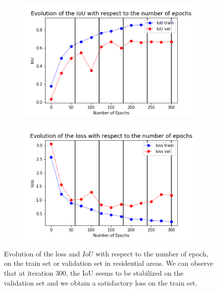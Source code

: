 \documentclass[9pt,conference,compsocconf]{IEEEtran}
\begin{document}
\begin{figure}[h!]
    \centering
     \begin{subfigure}[b]{0.23\textwidth}
         \centering
        \includegraphics[width=\textwidth]{figures/iou_batch5loss6.png}
     \end{subfigure}
     \hfill
     \begin{subfigure}[b]{0.23\textwidth}
         \centering
        \includegraphics[width=\textwidth]{figures/loss_batch5loss6.png}
     \end{subfigure}
\caption{\footnotesize{Evolution of the loss and $IoU$ with respect to the number of epoch, on the train set or validation set in residential areas. We can observe that at iteration $300$, the IoU seems to be stabilized on the validation set and we obtain a satisfactory loss on the train set.}
\label{fig:residencial_plots}}
\end{figure}
\end{document}
